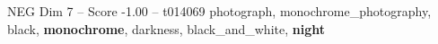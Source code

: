 \begin{textsample}{NEG Dim 7 – Score -1.00 – t014069}  \label{ex:f7_neg_032}
photograph, monochrome\_photography, black, \textbf{monochrome}, darkness, black\_and\_white, \textbf{night}

\end{textsample}
